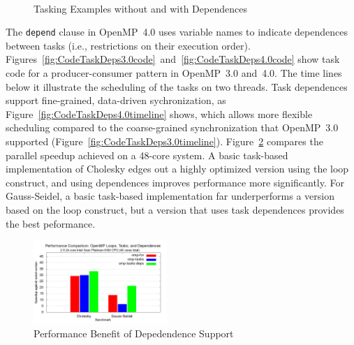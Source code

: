 \begin{figure}
~
~
\caption{Tasking Examples without and with Dependences\label{fig:CodeTaskDeps}}
\end{figure}

The \texttt{depend} clause in OpenMP~4.0 uses variable names to indicate
dependences between tasks (i.e., restrictions on their execution order).
Figures~\ref{fig:CodeTaskDeps3.0code}~and~\ref{fig:CodeTaskDeps4.0code} show 
task code for a producer-consumer pattern in OpenMP~3.0 and~4.0.  The 
time lines below it illustrate the scheduling of the tasks on two threads.
Task dependences support fine-grained, data-driven sychronization, as 
Figure~\ref{fig:CodeTaskDeps4.0timeline} shows, which allows more flexible 
scheduling compared to the coarse-grained synchronization that OpenMP~3.0
supported (Figure~\ref{fig:CodeTaskDeps3.0timeline}). 
Figure~\ref{fig:dep-speedup} compares the parallel speedup achieved on a 
48-core system. A basic task-based implementation of Cholesky edges out a 
highly optimized version using the loop construct, and using dependences 
improves performance more significantly. For Gauss-Seidel, a basic task-based 
implementation far underperforms a version based on the loop construct, 
but a version that uses task dependences provides the best peformance.

\begin{figure}
\includegraphics[width=0.45\textwidth]{pics/task-perf-results.png}
\caption{Performance Benefit of Depedendence Support}
\label{fig:dep-speedup}
\end{figure}


